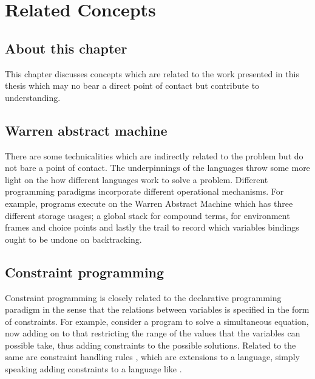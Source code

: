 \documentclass[proposal.tex]{subfiles}
\begin{document}
\chapter{Related Concepts}\label{chap:relatedWork}


\section{About this chapter}
This chapter discusses concepts which are related to the work presented in this thesis which may no bear a direct point of contact but 
contribute to understanding. 

\section{Warren abstract machine}
There are some technicalities which are indirectly related to the problem but do not bare a point of contact.
The underpinnings of the languages throw some more light on the how different languages work to solve a problem.
Different programming paradigms incorporate different operational mechanisms.
For example,  programs execute on the Warren Abstract Machine \cite{ait1999warren} which has three
different storage usages; a global stack for compound terms, for environment frames and choice points and lastly
the trail to record which variables bindings ought to be undone on backtracking.

\section{Constraint programming}
Constraint programming \cite{website:constraintprogwiki} is closely related to the declarative programming paradigm
in the sense that the relations between variables is specified in the form of constraints.
For example, consider a program to solve a simultaneous equation, now adding on to that restricting the range of
the values that the variables can possible take, thus adding constraints to the possible solutions.
Related to the same are constraint handling rules \cite{website:chrwiki}, which are extensions to a language,
simply speaking adding constraints to a language like .
\end{document}
